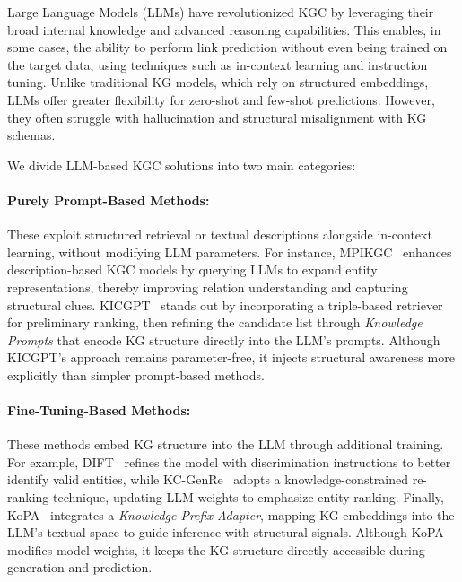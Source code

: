 \documentclass[12pt,a4paper]{article}
\begin{document}

Large Language Models (LLMs) have revolutionized KGC by leveraging their broad internal knowledge and advanced reasoning capabilities.
This enables, in some cases, the ability to perform link prediction without even being trained on the target data, using techniques such as in-context learning and instruction tuning.
Unlike traditional KG models, which rely on structured embeddings, LLMs offer greater flexibility for zero-shot and few-shot predictions.
However, they often struggle with hallucination and structural misalignment with KG schemas.


We divide LLM-based KGC solutions into two main categories:

\paragraph{Purely Prompt-Based Methods:} These exploit structured retrieval or textual descriptions alongside in-context learning, without modifying LLM parameters.
For instance, MPIKGC~\cite{xu2024mpikgc} enhances description-based KGC models by querying LLMs to expand entity representations, thereby improving relation understanding and capturing structural clues.
KICGPT~\cite{wei2023kicgpt} stands out by incorporating a triple-based retriever for preliminary ranking, then refining the candidate list through \emph{Knowledge Prompts} that encode KG structure directly into the LLM's prompts.
Although KICGPT's approach remains parameter-free, it injects structural awareness more explicitly than simpler prompt-based methods.

\paragraph{Fine-Tuning-Based Methods:} These methods embed KG structure into the LLM through additional training.
For example, DIFT~\cite{liu2024dift} refines the model with discrimination instructions to better identify valid entities, while KC-GenRe~\cite{wang2024kcgenre} adopts a knowledge-constrained re-ranking technique, updating LLM weights to emphasize entity ranking.
Finally, KoPA~\cite{qin2023kopa} integrates a \emph{Knowledge Prefix Adapter}, mapping KG embeddings into the LLM's textual space to guide inference with structural signals.
Although KoPA modifies model weights, it keeps the KG structure directly accessible during generation and prediction.
\end{document}
